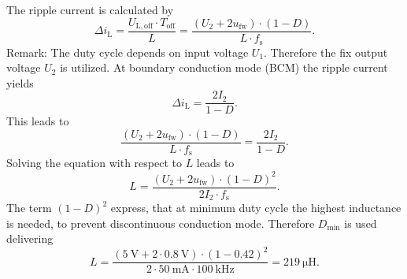 \begin{solutionblock}
    The ripple current is calculated by
    \begin{equation*}
        \Delta i_\mathrm{L}=\frac{U_\mathrm{L,off} \cdot T_\mathrm{off}}{L}
        =\frac{(U_\mathrm{2}+2u_\mathrm{fw}) \cdot (1-D)}{L \cdot f_\mathrm{s}}.
    \end{equation*}
    Remark: The duty cycle depends on input voltage $U_\mathrm{1}$. Therefore the fix output voltage $U_\mathrm{2}$ is utilized.
    At boundary conduction mode (BCM) the ripple current yields
    \begin{equation*}
        \Delta i_\mathrm{L} = \frac{2 I_\mathrm{2}}{1-D}.
    \end{equation*}
    This leads to
    \begin{equation*}
        \frac{(U_\mathrm{2}+2u_\mathrm{fw}) \cdot (1-D)}{L \cdot f_\mathrm{s}} = \frac{2 I_\mathrm{2}}{1-D}.
    \end{equation*}
    Solving the equation with respect to $L$ leads to
    \begin{equation*}
        L = \frac{(U_\mathrm{2}+2u_\mathrm{fw}) \cdot (1-D)^2}{2 I_\mathrm{2} \cdot f_\mathrm{s}}.
    \end{equation*}
    The term $(1-D)^2$ express, that at minimum duty cycle the highest inductance is needed, to prevent discontinuous conduction mode.
    Therefore $D_\mathrm{min}$ is used delivering
    \begin{equation*}
        L = \frac{(\SI{5}{\volt}+2 \cdot \SI{0.8}{\volt}) \cdot (1-0.42)^2}{2 \cdot \SI{50}{\milli\ampere} \cdot \SI{100}{\kilo\hertz}}
        = \SI{219}{\micro\henry}.
    \end{equation*}

\end{solutionblock}


